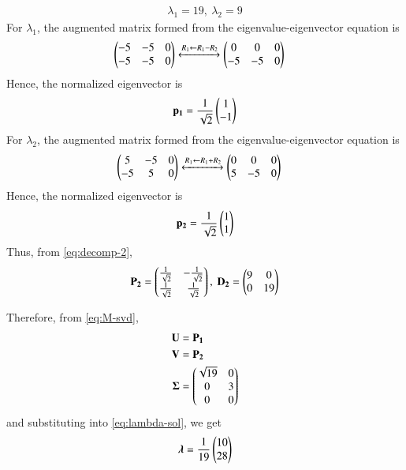 \documentclass[journal,12pt,twocolumn]{IEEEtran}
\renewcommand{\vec}[1]{\boldsymbol{\mathbf{#1}}}
\begin{document}
\begin{enumerate}
\begin{enumerate}
        \begin{align}
            \lambda_1 = 19,\ \lambda_2 = 9
        \end{align}
        For $\lambda_1$, the augmented matrix formed from the 
        eigenvalue-eigenvector equation is
        \begin{align}
            \begin{pmatrix}-5&-5&0\\-5&-5&0\end{pmatrix} &\xleftrightarrow[]{R_1 \leftarrow R_1-R_2} \begin{pmatrix}0&0&0\\-5&-5&0\end{pmatrix}
        \end{align}
        Hence, the normalized eigenvector is
        \begin{align}
            \vec{p_1} = \frac{1}{\sqrt{2}}\myvec{1\\-1}
        \end{align}
        For $\lambda_2$, the augmented matrix formed from the 
        eigenvalue-eigenvector equation is
        \begin{align}
            \begin{pmatrix}5&-5&0\\-5&5&0\end{pmatrix} &\xleftrightarrow[]{R_1 \leftarrow R_1+R_2} \begin{pmatrix}0&0&0\\5&-5&0\end{pmatrix}
        \end{align}
        Hence, the normalized eigenvector is
        \begin{align}
            \vec{p_2} = \frac{1}{\sqrt{2}}\myvec{1\\1}
        \end{align}
        Thus, from \eqref{eq:decomp-2},
        \begin{align}
            \vec{P_2} = \myvec{\frac{1}{\sqrt{2}}&-\frac{1}{\sqrt{2}}\\\frac{1}{\sqrt{2}}&\frac{1}{\sqrt{2}}},\ \vec{D_2} = \myvec{9&0\\0&19}
            \label{eq:eig-params-2}
        \end{align}
    \end{enumerate}
    Therefore, from \eqref{eq:M-svd},
    \begin{align}
        \vec{U} &= \vec{P_1} \\ 
        \vec{V} &= \vec{P_2} \\
        \vec{\Sigma} &= \myvec{\sqrt{19}&0\\0&3\\0&0}
        \label{eq:svd-params}
    \end{align}
    and substituting into \eqref{eq:lambda-sol}, we get
    \begin{align}
        \vec{\lambda} = \frac{1}{19}\myvec{10\\28}

\end{align}
\end{enumerate}
\end{document}
